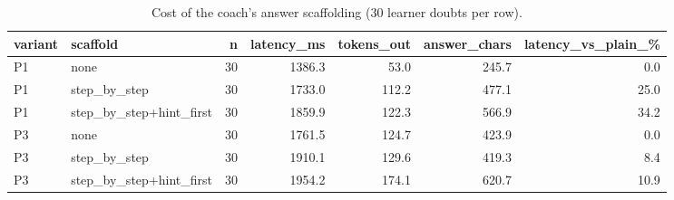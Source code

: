 \begin{table}[htbp]
\centering
\small
\caption{Cost of the coach's answer scaffolding (30 learner doubts per row).}
\label{tab:scaffold_cost}
\begin{tabular}{l l r r r r r}
\toprule
variant & scaffold & n & latency\_ms & tokens\_out & answer\_chars & latency\_vs\_plain\_\% \\
\midrule
P1 & none & 30 & 1386.3 & 53.0 & 245.7 & 0.0 \\
P1 & step\_by\_step & 30 & 1733.0 & 112.2 & 477.1 & 25.0 \\
P1 & step\_by\_step+hint\_first & 30 & 1859.9 & 122.3 & 566.9 & 34.2 \\
P3 & none & 30 & 1761.5 & 124.7 & 423.9 & 0.0 \\
P3 & step\_by\_step & 30 & 1910.1 & 129.6 & 419.3 & 8.4 \\
P3 & step\_by\_step+hint\_first & 30 & 1954.2 & 174.1 & 620.7 & 10.9 \\
\bottomrule
\end{tabular}
\end{table}
